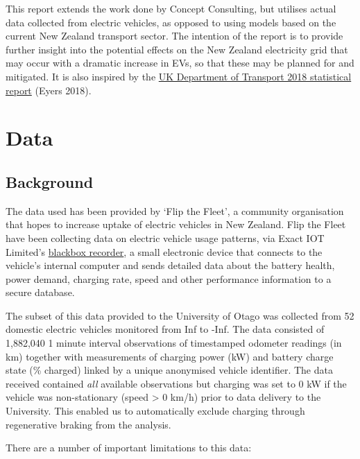 \documentclass[]{article}
\begin{document}
This report extends the work done by Concept Consulting, but utilises actual data collected from electric vehicles, as opposed to using models based on the current New Zealand transport sector. The intention of the report is to provide further insight into the potential effects on the New Zealand electricity grid that may occur with a dramatic increase in EVs, so that these may be planned for and mitigated. It is also inspired by the \href{https://assets.publishing.service.gov.uk/government/uploads/system/uploads/attachment_data/file/764270/electric-chargepoint-analysis-2017-domestics.pdf}{UK Department of Transport 2018 statistical report} (Eyers 2018).

\hypertarget{data}{%
\section{Data}\label{data}}

\hypertarget{background}{%
\subsection{Background}\label{background}}

The data used has been provided by `Flip the Fleet', a community organisation that hopes to increase uptake of electric vehicles in New Zealand. Flip the Fleet have been collecting data on electric vehicle usage patterns, via Exact IOT Limited's \href{https://flipthefleet.org/ev-black-box/}{blackbox recorder}, a small electronic device that connects to the vehicle's internal computer and sends detailed data about the battery health, power demand, charging rate, speed and other performance information to a secure database.

The subset of this data provided to the University of Otago was collected from 52 domestic electric vehicles monitored from Inf to -Inf. The data consisted of 1,882,040 1 minute interval observations of timestamped odometer readings (in km) together with measurements of charging power (kW) and battery charge state (\% charged) linked by a unique anonymised vehicle identifier. The data received contained \emph{all} available observations but charging was set to 0 kW if the vehicle was non-stationary (speed \textgreater{} 0 km/h) prior to data delivery to the University. This enabled us to automatically exclude charging through regenerative braking from the analysis.

There are a number of important limitations to this data:
\end{document}
